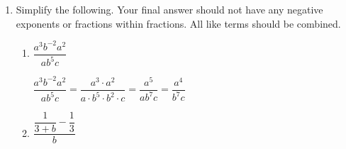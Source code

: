 \documentclass{article}
\begin{document}
\begin{enumerate}
\begin{enumerate}
\begin{solution}
                \begin{align*}
               & \displaystyle \dfrac{4s}{a+\dfrac{s}{q^2}}=2 \\
                   & 4s = 2(a + \frac{s}{q^2}) \\
                & 4s = 2a + \frac{2s}{q^2} \\
                & 4sq^2 = 2aq^2 + 2s \\
                & 4sq^2 - 2s = 2aq^2 \\
                & s(4q^2 - 2) = 2aq^2 \\
                & s = \dfrac{2aq^2}{4q^2 - 2}\\
                \end{align*}
            \end{solution}
            
            \begin{problemonly}
                \newpage
            \end{problemonly}
            \item 
            \begin{problem} Simplify the following. Your final answer should not have any negative exponents or fractions within fractions. All like terms should be combined.
            \end{problem}
                    \begin{enumerate}
                        \item 
                        \begin{problem} 
                        $\dfrac{a^3 b^{-2} a^2}{a b^5 c}$

                        \vspace{1.5in}
                        \end{problem}
                
                        \begin{solution}
                            $\dfrac{a^3 b^{-2} a^2}{a b^5 c} = \dfrac{a^3 \cdot a^2}{a \cdot b^5 \cdot b^2 \cdot c} = \dfrac{a^5}{ab^7c} = \dfrac{a^4}{b^7 c}$
                        \end{solution}
                        
                        \item 
                        \begin{problem}[\vfill] $\dfrac{\dfrac{1}{3+b}-\dfrac{1}{3}}{b}$
                        \end{problem}


\end{enumerate}
\end{enumerate}
\end{enumerate}
\end{document}

